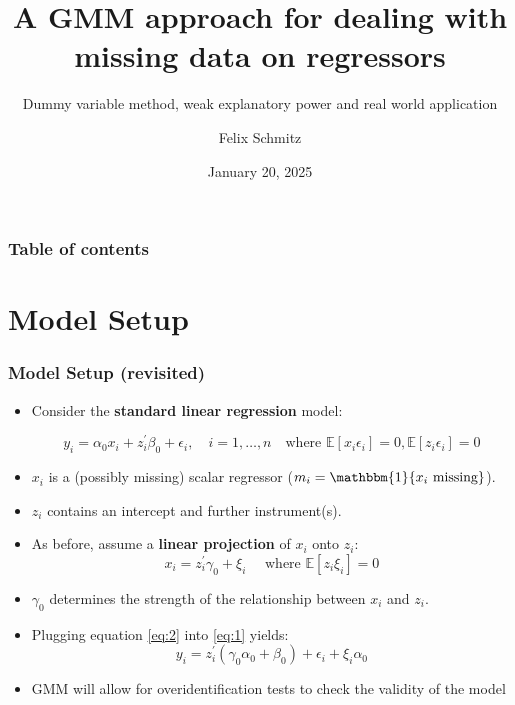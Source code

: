 \documentclass[aspectratio=1610]{beamer}
\title{A GMM approach for dealing with missing data on regressors}
\subtitle{Dummy variable method, weak explanatory power and real world application}
\date{January 20, 2025}
\author{Felix Schmitz}
\begin{document}

\begin{frame}[plain]
	\titlepage
\end{frame}

\begin{framecontent}
	\frametitle{Table of contents}
\end{framecontent}

\section{Model Setup}

\begin{frame}
    \frametitle{Model Setup (revisited)}
    \begin{itemize}
        \item<1-> Consider the \textbf{standard linear regression} model:

        \begin{equation}\label{eq:1}
            y_i = \alpha_0 x_i + z_i^{\prime} \beta_0 + \epsilon_i, \quad i= 1,\ldots,n \quad \text{where }  \mathbb{E}[x_i \epsilon_i] = 0, \mathbb{E}[z_i \epsilon_i] = 0
        \end{equation}

        \item<1-> $x_i$ is a (possibly missing) scalar regressor (\( m_i = \mathbbm{1}\{x_i \text{ missing}\} \)).
		\item<1-> $z_i$ contains an intercept and further instrument(s).
        \item<2-> As before, assume a \textbf{linear projection} of $x_i$ onto $z_i$:
        \begin{equation}\label{eq:2}
            x_i = z_i^{\prime} \gamma_0 + \xi_i \quad \text{ where } \mathbb{E}[z_i \xi_i] = 0
        \end{equation}

        \item<3-> $\gamma_0$ determines the strength of the relationship between $x_i$ and $z_i$.
        \item<3-> Plugging equation \eqref{eq:2} into \eqref{eq:1} yields:
        \begin{equation}\label{eq:3}
            y_i = z_i^{\prime} (\gamma_0 \alpha_0 + \beta_0) + \epsilon_i + \xi_i \alpha_0
        \end{equation}
		\item<4-> GMM will allow for overidentification tests to check the validity of the model
    \end{itemize}
\end{frame}
\end{document}
